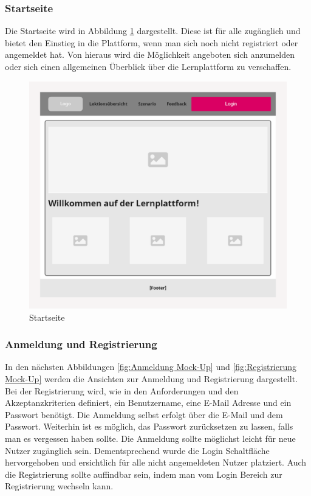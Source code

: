 \subsubsection{Startseite}

Die Startseite wird in Abbildung \ref{fig:Startseite Mock-Up} dargestellt. Diese ist für alle zugänglich und bietet den Einstieg in die Plattform, wenn man sich noch nicht registriert oder angemeldet hat. 
Von hieraus wird die Möglichkeit angeboten sich anzumelden oder sich einen allgemeinen Überblick über die Lernplattform zu verschaffen.

\begin{figure}[H]
    \centering
    \includegraphics[width=1.0\textwidth]{assets/screenshots/mockups/Homepage-MockUp.png}
    \caption{Startseite}
    \label{fig:Startseite Mock-Up}
\end{figure}


\subsubsection{Anmeldung und Registrierung}

In den nächsten Abbildungen \ref{fig:Anmeldung Mock-Up} und \ref{fig:Registrierung Mock-Up} werden die Ansichten zur Anmeldung und Registrierung dargestellt.
Bei der Registrierung wird, wie in den Anforderungen und den Akzeptanzkriterien definiert, ein Benutzername, eine E-Mail Adresse und ein Passwort benötigt. 
Die Anmeldung selbst erfolgt über die E-Mail und dem Passwort. Weiterhin ist es möglich, das Passwort zurücksetzen zu lassen, falls man es vergessen haben sollte. 
Die Anmeldung sollte möglichst leicht für neue Nutzer zugänglich sein. Dementsprechend wurde die Login Schaltfläche hervorgehoben und ersichtlich für alle nicht angemeldeten Nutzer platziert.
Auch die Registrierung sollte auffindbar sein, indem man vom Login Bereich zur Registrierung wechseln kann.

